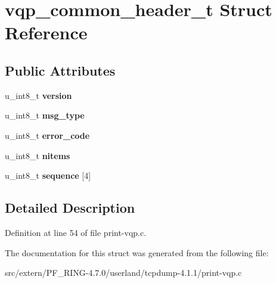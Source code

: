 \hypertarget{structvqp__common__header__t}{
\section{vqp\_\-common\_\-header\_\-t Struct Reference}
\label{structvqp__common__header__t}
}
\subsection*{Public Attributes}
\begin{DoxyCompactItemize}
\item 
\hypertarget{structvqp__common__header__t_afb7626abd4c6ee455dbdead6f01a1f8f}{
u\_\-int8\_\-t {\bfseries version}}
\label{structvqp__common__header__t_afb7626abd4c6ee455dbdead6f01a1f8f}

\item 
\hypertarget{structvqp__common__header__t_aed085f64f7c2b52773386e2756b46519}{
u\_\-int8\_\-t {\bfseries msg\_\-type}}
\label{structvqp__common__header__t_aed085f64f7c2b52773386e2756b46519}

\item 
\hypertarget{structvqp__common__header__t_ae65337b59c580704e2689c7f5a51ffc5}{
u\_\-int8\_\-t {\bfseries error\_\-code}}
\label{structvqp__common__header__t_ae65337b59c580704e2689c7f5a51ffc5}

\item 
\hypertarget{structvqp__common__header__t_aa8920dd413fd67d4776fca4b79e53345}{
u\_\-int8\_\-t {\bfseries nitems}}
\label{structvqp__common__header__t_aa8920dd413fd67d4776fca4b79e53345}

\item 
\hypertarget{structvqp__common__header__t_aadc3f2bdeb632b8200017b99a77fee67}{
u\_\-int8\_\-t {\bfseries sequence} \mbox{[}4\mbox{]}}
\label{structvqp__common__header__t_aadc3f2bdeb632b8200017b99a77fee67}

\end{DoxyCompactItemize}


\subsection{Detailed Description}


Definition at line 54 of file print-\/vqp.c.



The documentation for this struct was generated from the following file:\begin{DoxyCompactItemize}
\item 
src/extern/PF\_\-RING-\/4.7.0/userland/tcpdump-\/4.1.1/print-\/vqp.c\end{DoxyCompactItemize}
